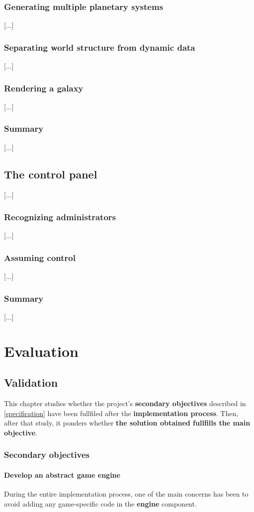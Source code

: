 \documentclass[a4paper,11pt,titlepage,abstract,numbers=noenddot,automark,mnsy,intlimits,rgb,dvipsnames]{report}
\begin{document}
\section{Generating multiple planetary systems}
[...]
\section{Separating world structure from dynamic data}
[...]
\section{Rendering a galaxy}
[...]
\section{Summary}
[...]
\chapter{The control panel}
\label{control_panel}
[...]
\section{Recognizing administrators}
[...]
\section{Assuming control}
[...]
\section{Summary}
[...]
\part{Evaluation}
\chapter{Validation}
\label{validation}
This chapter studies whether the project's \textbf{secondary objectives} described in \autoref{specification}
have been fullfiled after the \textbf{implementation process}. Then, after that study, it ponders whether
\textbf{the solution obtained fullfills the main objective}.
\section{Secondary objectives}
\subsection{Develop an abstract game engine}
During the entire implementation process, one of the main concerns has been to avoid adding any game-specific code
in the \textbf{engine} component.
\end{document}
